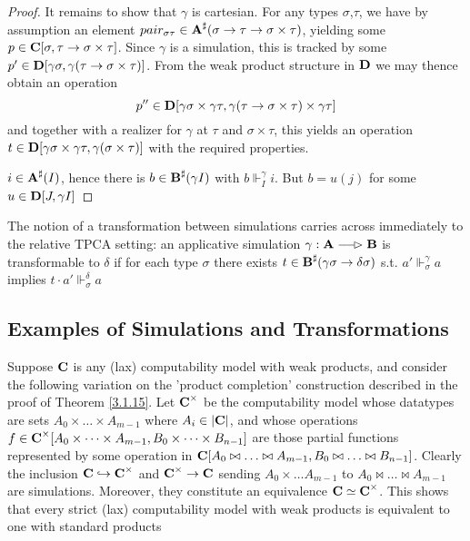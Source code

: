 \documentclass[11pt]{article}
\begin{document}
\begin{proof}
It remains to show that \(\gamma\) is cartesian. For any types \(\sigma\),\(\tau\), we have by assumption an element
\(pair_{\sigma\tau}\in\operatorname{\textbf{A}}^\sharp(\sigma\to\tau\to\sigma\times\tau)\), yielding some \(p\in\operatorname{\textbf{C}}[\sigma,\tau\to\sigma\times\tau]\). Since \(\gamma\) is a simulation, this is
tracked by some \(p'\in\operatorname{\textbf{D}}[\gamma\sigma,\gamma(\tau\to\sigma\times\tau)]\). From the weak product structure in \(\operatorname{\textbf{D}}\) we may thence
obtain an operation
\begin{equation*}
p''\in\operatorname{\textbf{D}}[\gamma\sigma\times\gamma\tau,\gamma(\tau\to\sigma\times\tau)\times\gamma\tau]
\end{equation*}
and together with a realizer for \(\gamma\) at \(\tau\) and \(\sigma\times\tau\), this yields an
operation \(t\in\operatorname{\textbf{D}}[\gamma\sigma\times\gamma\tau,\gamma(\sigma\times\tau)]\) with the required properties.

\(i\in\operatorname{\textbf{A}}^\sharp(I)\), hence there is \(b\in\operatorname{\textbf{B}}^\sharp(\gamma I)\) with \(b\Vdash_I^\gamma i\). But \(b=u(j)\) for
some \(u\in\operatorname{\textbf{D}}[J,\gamma I]\)
\end{proof}

The notion of a transformation between simulations carries across immediately to the relative
TPCA setting: an applicative simulation \(\gamma:\bA\lrarhd\bB\) is transformable to \(\delta\) if for each type
\(\sigma\) there exists \(t\in\operatorname{\textbf{B}}^\sharp(\gamma\sigma\to\delta\sigma)\) s.t. \(a'\Vdash_\sigma^\gamma a\) implies \(t\cdot a'\Vdash_\sigma^\delta a\)
\subsection{Examples of Simulations and Transformations}
\label{sec:org52edb97}
\begin{examplle}[]
Suppose \(\operatorname{\textbf{C}}\) is any (lax) computability model with weak products, and consider the following
variation on the 'product completion' construction described in the proof of Theorem \ref{3.1.15}.
Let \(\operatorname{\textbf{C}}^\times\) be the computability model whose datatypes are sets \(A_0\times\dots\times A_{m-1}\)
where \(A_i\in\abs{\bC}\), and whose operations \(f\in\operatorname{\textbf{C}}^\times[A_0\times\dots\times A_{m-1},B_0\times\dots\times B_{n-1}]\) are those
partial functions represented by some operation in \(\operatorname{\textbf{C}}[A_0\bowtie\dots\bowtie A_{m-1},B_0\bowtie\dots\bowtie B_{n-1}]\). Clearly
the inclusion \(\operatorname{\textbf{C}}\hookrightarrow\operatorname{\textbf{C}}^\times\) and \(\operatorname{\textbf{C}}^\times\to\operatorname{\textbf{C}}\) sending \(A_0\times\dots A_{m-1}\) to \(A_0\bowtie\dots\bowtie A_{m-1}\) are
simulations. Moreover, they constitute an equivalence \(\operatorname{\textbf{C}}\simeq\operatorname{\textbf{C}}^\times\). This shows that every strict
(lax) computability model with weak products is equivalent to one with standard products
\end{examplle}
\end{document}
